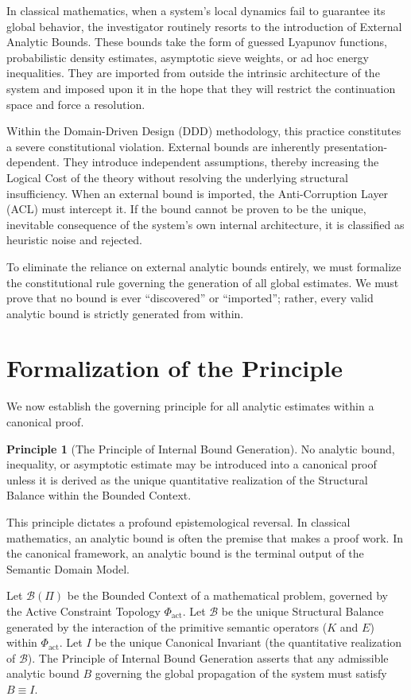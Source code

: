 \documentclass[12pt,openany]{extbook}
\theoremstyle{plain}
\theoremstyle{definition}
\newtheorem{principle}{Principle}[chapter]
\begin{document}
In classical mathematics, when a system's local dynamics fail to guarantee its global behavior, the investigator routinely resorts to the introduction of External Analytic Bounds. These bounds take the form of guessed Lyapunov functions, probabilistic density estimates, asymptotic sieve weights, or ad hoc energy inequalities. They are imported from outside the intrinsic architecture of the system and imposed upon it in the hope that they will restrict the continuation space and force a resolution.

Within the Domain-Driven Design (DDD) methodology, this practice constitutes a severe constitutional violation. External bounds are inherently presentation-dependent. They introduce independent assumptions, thereby increasing the Logical Cost of the theory without resolving the underlying structural insufficiency. When an external bound is imported, the Anti-Corruption Layer (ACL) must intercept it. If the bound cannot be proven to be the unique, inevitable consequence of the system's own internal architecture, it is classified as heuristic noise and rejected.

To eliminate the reliance on external analytic bounds entirely, we must formalize the constitutional rule governing the generation of all global estimates. We must prove that no bound is ever ``discovered'' or ``imported''; rather, every valid analytic bound is strictly generated from within.

\section{Formalization of the Principle}

We now establish the governing principle for all analytic estimates within a canonical proof.

\begin{principle}[The Principle of Internal Bound Generation]
No analytic bound, inequality, or asymptotic estimate may be introduced into a canonical proof unless it is derived as the unique quantitative realization of the Structural Balance within the Bounded Context.
\end{principle}

This principle dictates a profound epistemological reversal. In classical mathematics, an analytic bound is often the premise that makes a proof work. In the canonical framework, an analytic bound is the terminal output of the Semantic Domain Model.

Let $\mathcal{B}(\Pi)$ be the Bounded Context of a mathematical problem, governed by the Active Constraint Topology $\Phi_{\mathrm{act}}$. Let $\mathcal{B}$ be the unique Structural Balance generated by the interaction of the primitive semantic operators ($K$ and $E$) within $\Phi_{\mathrm{act}}$. Let $I$ be the unique Canonical Invariant (the quantitative realization of $\mathcal{B}$). The Principle of Internal Bound Generation asserts that any admissible analytic bound $B$ governing the global propagation of the system must satisfy $B \equiv I$.
\end{document}
